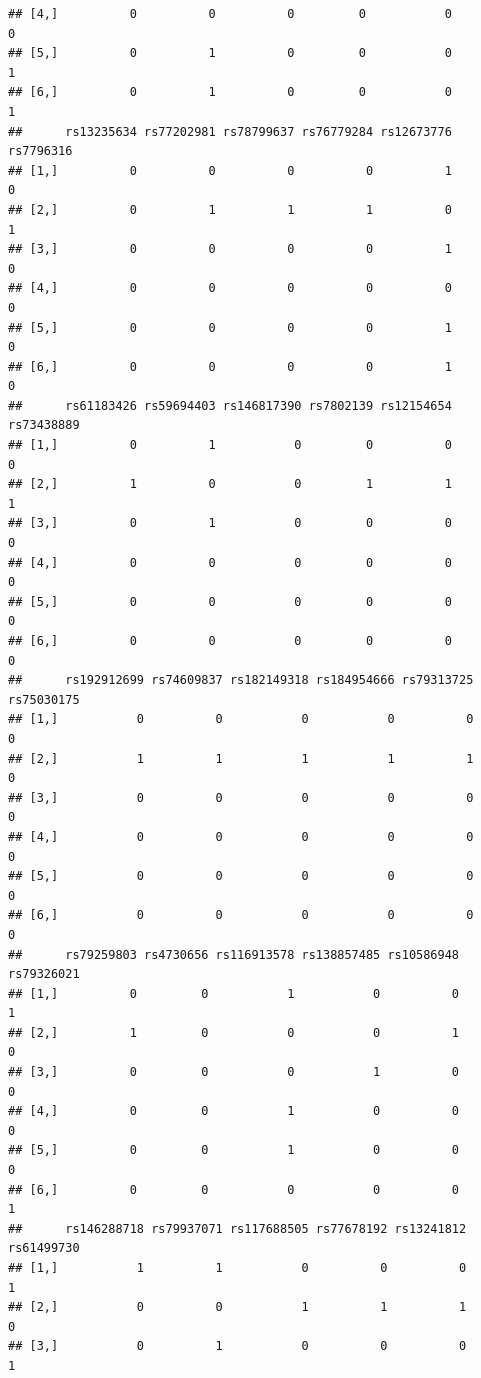 \documentclass[
]{article}
\begin{document}
\begin{verbatim}
## [4,]          0          0          0         0           0          0
## [5,]          0          1          0         0           0          1
## [6,]          0          1          0         0           0          1
##      rs13235634 rs77202981 rs78799637 rs76779284 rs12673776 rs7796316
## [1,]          0          0          0          0          1         0
## [2,]          0          1          1          1          0         1
## [3,]          0          0          0          0          1         0
## [4,]          0          0          0          0          0         0
## [5,]          0          0          0          0          1         0
## [6,]          0          0          0          0          1         0
##      rs61183426 rs59694403 rs146817390 rs7802139 rs12154654 rs73438889
## [1,]          0          1           0         0          0          0
## [2,]          1          0           0         1          1          1
## [3,]          0          1           0         0          0          0
## [4,]          0          0           0         0          0          0
## [5,]          0          0           0         0          0          0
## [6,]          0          0           0         0          0          0
##      rs192912699 rs74609837 rs182149318 rs184954666 rs79313725 rs75030175
## [1,]           0          0           0           0          0          0
## [2,]           1          1           1           1          1          0
## [3,]           0          0           0           0          0          0
## [4,]           0          0           0           0          0          0
## [5,]           0          0           0           0          0          0
## [6,]           0          0           0           0          0          0
##      rs79259803 rs4730656 rs116913578 rs138857485 rs10586948 rs79326021
## [1,]          0         0           1           0          0          1
## [2,]          1         0           0           0          1          0
## [3,]          0         0           0           1          0          0
## [4,]          0         0           1           0          0          0
## [5,]          0         0           1           0          0          0
## [6,]          0         0           0           0          0          1
##      rs146288718 rs79937071 rs117688505 rs77678192 rs13241812 rs61499730
## [1,]           1          1           0          0          0          1
## [2,]           0          0           1          1          1          0
## [3,]           0          1           0          0          0          1

\end{verbatim}
\end{document}
